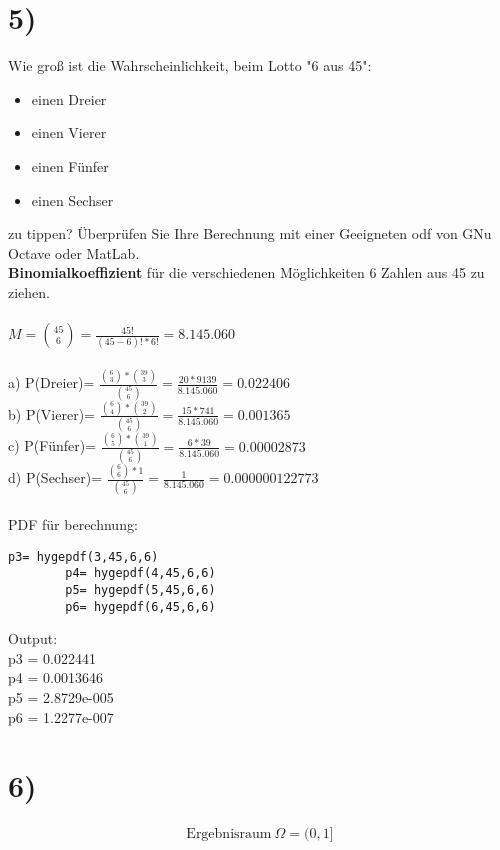 \documentclass[11pt,a4paper]{article}
\begin{document}
	\section*{5)}
	Wie groß ist die Wahrscheinlichkeit, beim Lotto "6 aus 45":
	\begin{itemize}
		\item einen Dreier
		\item einen Vierer
		\item einen Fünfer
		\item einen Sechser
	\end{itemize}
	zu tippen? Überprüfen Sie Ihre Berechnung mit einer Geeigneten odf von GNu Octave oder MatLab.\\

	\textbf{Binomialkoeffizient} für die verschiedenen Möglichkeiten 6 Zahlen aus 45 zu ziehen.\\\\
	\(M=\binom{45}{6} =\frac{45!}{(45-6)! * 6!}= 8.145.060\)\\\\
	a) P(Dreier)= \( \frac{\binom{6}{3} * \binom{39}{3}}{\binom{45}{6}}=\frac{20*9139}{8.145.060}=0.022406\)\\
	b) P(Vierer)= \( \frac{\binom{6}{4} * \binom{39}{2}}{\binom{45}{6}}=\frac{15*741}{8.145.060}=0.001365\)\\
	c) P(Fünfer)= \( \frac{\binom{6}{5} * \binom{39}{1}}{\binom{45}{6}}=\frac{6*39}{8.145.060}=0.00002873\)\\
	d) P(Sechser)= \( \frac{\binom{6}{6} * 1}{\binom{45}{6}}=\frac{1}{8.145.060}=0.000000122773\)\\\\
	PDF für berechnung:\\
	\begin{lstlisting}[frame=single]
		p3= hygepdf(3,45,6,6)
		p4= hygepdf(4,45,6,6)
		p5= hygepdf(5,45,6,6)
		p6= hygepdf(6,45,6,6)
	\end{lstlisting}
	Output:\\
	p3 =  0.022441\\
	p4 =  0.0013646\\
	p5 =   2.8729e-005\\
	p6 =   1.2277e-007\\

	\section*{6)}

  \begin{align*}
    \text{Ergebnisraum}\ \Omega = (0,1]
  \end{align*}
\end{document}
